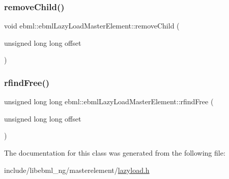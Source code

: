 \mbox{\label{classebml_1_1ebmlLazyLoadMasterElement_ac068afeec4ce0913d6ac94e834bdf79b}} 
\subsubsection{\texorpdfstring{remove\+Child()}{removeChild()}\hspace{0.1cm}{\footnotesize\ttfamily [3/3]}}
{\footnotesize\ttfamily void ebml\+::ebml\+Lazy\+Load\+Master\+Element\+::remove\+Child (\begin{DoxyParamCaption}\item[{unsigned long long}]{offset }\end{DoxyParamCaption})}

\mbox{\label{classebml_1_1ebmlLazyLoadMasterElement_a60d9ff3efbee6cca4b88c00556a865a9}} 
\subsubsection{\texorpdfstring{rfind\+Free()}{rfindFree()}}
{\footnotesize\ttfamily unsigned long long ebml\+::ebml\+Lazy\+Load\+Master\+Element\+::rfind\+Free (\begin{DoxyParamCaption}\item[{unsigned long long}]{offset }\end{DoxyParamCaption})}



The documentation for this class was generated from the following file\+:\begin{DoxyCompactItemize}
\item 
include/libebml\+\_\+ng/masterelement/\mbox{\hyperlink{lazyload_8h}{lazyload.\+h}}\end{DoxyCompactItemize}

